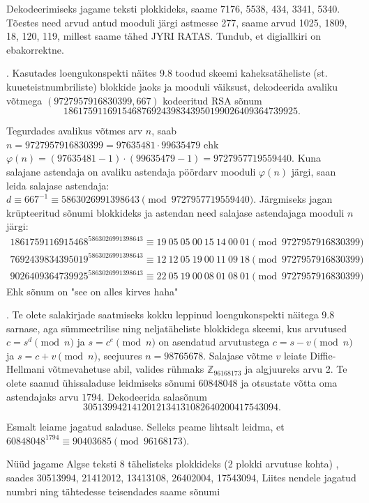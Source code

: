\documentclass[a4paper, 10pt]{article}
\newcommand{\Z}{\mathbb{Z}}
\begin{document}
\bigskip
Dekodeerimiseks jagame teksti plokkideks, saame 7176, 5538, 434, 3341, 5340. Tõestes need arvud antud mooduli järgi astmesse 277, saame arvud 1025, 1809, 18, 120, 119, millest saame tähed JYRI RATAS. Tundub, et digiallkiri on ebakorrektne.
\bigskip

. Kasutades loengukonspekti näites 9.8 toodud skeemi kaheksatäheliste (st. kuueteist\-numbriliste) blokkide jaoks ja mooduli väiksust, dekodeerida avaliku võtmega \linebreak $(9727957916830399,667)$ kodeeritud RSA sõnum $$1861759116915468 7692439834395019 9026409364739925.$$ 

\bigskip
Tegurdades avalikus võtmes arv $n$, saab $n=9727957916830399=97635481\cdot99635479$ ehk $\varphi(n)=(97635481-1)\cdot(99635479-1)=9727957719559440$. Kuna salajane astendaja on avaliku astendaja pöördarv mooduli $\varphi(n)$ järgi, saan leida salajase astendaja: $d\equiv667^{-1}\equiv5863026991398643\pmod{9727957719559440}$. Järgmiseks jagan krüpteeritud sõnumi blokkideks ja astendan need salajase astendajaga mooduli $n$ järgi:
\begin{gather*}
1861759116915468^{5863026991398643}\equiv19\ 05\ 05\ 00\ 15\ 14\ 00\ 01\pmod{9727957916830399}\\ 7692439834395019^{5863026991398643}\equiv12\ 12\ 05\ 19\ 00\ 11\ 09\ 18\pmod{9727957916830399}\\ 9026409364739925^{5863026991398643}\equiv22\ 05\ 19\ 00\ 08\ 01\ 08\ 01\pmod{9727957916830399}
\end{gather*}
Ehk sõnum on "see on alles kirves haha"
\bigskip
\pagebreak

. Te olete salakirjade saatmiseks kokku leppinud loengukonspekti näitega 9.8 sarnase, aga sümmeetrilise ning neljatäheliste blokkidega skeemi, kus arvu\-tused $c=s^d\pmod{n}$ ja $s=c^e\pmod{n}$ on asendatud arvutustega $c=s-v\pmod{n}$ ja $s=c+v\pmod{n}$, seejuures $n=98765678$. Salajase võtme $v$ leiate Diffie-Hellmani võtmevahetuse abil, valides rühmaks $\Z_{96168173}$ ja algjuureks arvu 2. Te olete saanud ühissaladuse leidmiseks sõnumi $60848048$ ja otsustate võtta oma astendajaks arvu $1794$. Dekodeerida salasõnum $$30513994 21412012 13413108 26402004 17543094.$$

\bigskip
Esmalt leiame jagatud saladuse. Selleks peame lihtsalt leidma, et $60848048^{1794}\equiv90403685\pmod{96168173}$.

Nüüd jagame Algse teksti 8 tähelisteks plokkideks (2 plokki arvutuse kohta) , saades 30513994, 21412012, 13413108, 26402004, 17543094, Liites nendele jagatud numbri ning tähtedesse teisendades saame sõnumi
\end{document}
